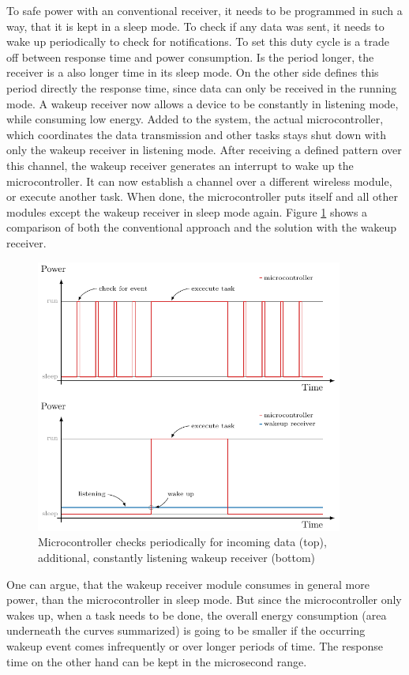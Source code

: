 To safe power with an conventional receiver, it needs to be programmed in such a way, that it is kept in a sleep mode.
To check if any data was sent, it needs to wake up periodically to check for notifications.
To set this duty cycle is a trade off between response time and power consumption.
Is the period longer, the receiver is a also longer time in its sleep mode.
On the other side defines this period directly the response time, since data can only be received in the running mode.
A wakeup receiver now allows a device to be constantly in listening mode, while consuming low energy.
Added to the system, the actual microcontroller, which coordinates the data transmission and other tasks stays shut down with only the wakeup receiver in listening mode.
After receiving a defined pattern over this channel, the wakeup receiver generates an interrupt to wake up the microcontroller. 
It can now establish a channel over a different wireless module, or execute another task.
When done, the microcontroller puts itself and all other modules except the wakeup receiver in sleep mode again.
Figure \ref{theory:wake} shows a comparison of both the conventional approach and the solution with the wakeup receiver. 
\begin{figure}[h]
	\centering
	\includegraphics[width=0.9\textwidth]{2-theory/wakeup/graphics/wake_comp.pdf}
	\caption{Microcontroller checks periodically for incoming data (top), additional, constantly listening  wakeup receiver (bottom)\label{theory:wake}}
\end{figure}

One can argue, that the wakeup receiver module consumes in general more power, than the microcontroller in sleep mode.
But since the microcontroller only wakes up, when a task needs to be done, the overall energy consumption (area underneath the curves summarized) is going to be smaller if the occurring wakeup event comes infrequently or over longer periods of time.
The response time on the other hand can be kept in the microsecond range.
